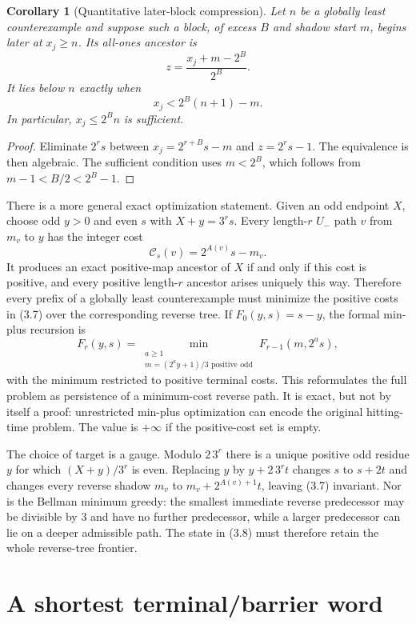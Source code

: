 \documentclass[11pt,reqno]{amsart}
\newtheorem{corollary}[theorem]{Corollary}
\theoremstyle{remark}
\newcommand{\Um}{U_{-}}
\begin{document}
\begin{corollary}[Quantitative later-block compression]
Let $n$ be a globally least counterexample and suppose such a block, of
excess $B$ and shadow start $m$, begins later at $x_j\ge n$.  Its all-ones
ancestor is
\[
 z=\frac{x_j+m-2^B}{2^B}.
\]
It lies below $n$ exactly when
\[
 x_j<2^B(n+1)-m.                                      \tag{3.6}
\]
In particular, $x_j\le2^Bn$ is sufficient.
\end{corollary}

\begin{proof}
Eliminate $2^rs$ between $x_j=2^{r+B}s-m$ and
$z=2^rs-1$.  The equivalence is then algebraic.  The sufficient condition
uses $m<2^B$, which follows from $m-1<B/2<2^B-1$.
\end{proof}

There is a more general exact optimization statement.  Given an odd endpoint
$X$, choose odd $y>0$ and even $s$ with $X+y=3^rs$.  Every length-$r$
$\Um$ path $v$ from $m_v$ to $y$ has the integer cost
\[
 \mathcal C_s(v)=2^{A(v)}s-m_v.                       \tag{3.7}
\]
It produces an exact positive-map ancestor of $X$ if and only if this cost is
positive, and every positive length-$r$ ancestor arises uniquely this way.
Therefore every prefix of a globally least counterexample must minimize the
positive costs in (3.7) over the corresponding reverse tree.  If
$F_0(y,s)=s-y$, the formal min-plus recursion is
\[
 F_r(y,s)=\min_{\substack{a\ge1\\
             m=(2^ay+1)/3\text{ positive odd}}}
 F_{r-1}(m,2^as),                                     \tag{3.8}
\]
with the minimum restricted to positive terminal costs.  This reformulates
the full problem as persistence of a minimum-cost reverse path.  It is exact,
but not by itself a proof: unrestricted min-plus optimization can encode the
original hitting-time problem.  The value is $+\infty$ if the positive-cost
set is empty.

The choice of target is a gauge.  Modulo $2\,3^r$ there is a unique positive
odd residue $y$ for which $(X+y)/3^r$ is even.  Replacing
$y$ by $y+2\,3^rt$ changes $s$ to $s+2t$ and changes every reverse shadow
$m_v$ to $m_v+2^{A(v)+1}t$, leaving (3.7) invariant.  Nor is the Bellman
minimum greedy: the smallest immediate reverse predecessor may be divisible
by $3$ and have no further predecessor, while a larger predecessor can lie on
a deeper admissible path.  The state in (3.8) must therefore retain the whole
reverse-tree frontier.

\section{A shortest terminal/barrier word}
\end{document}
